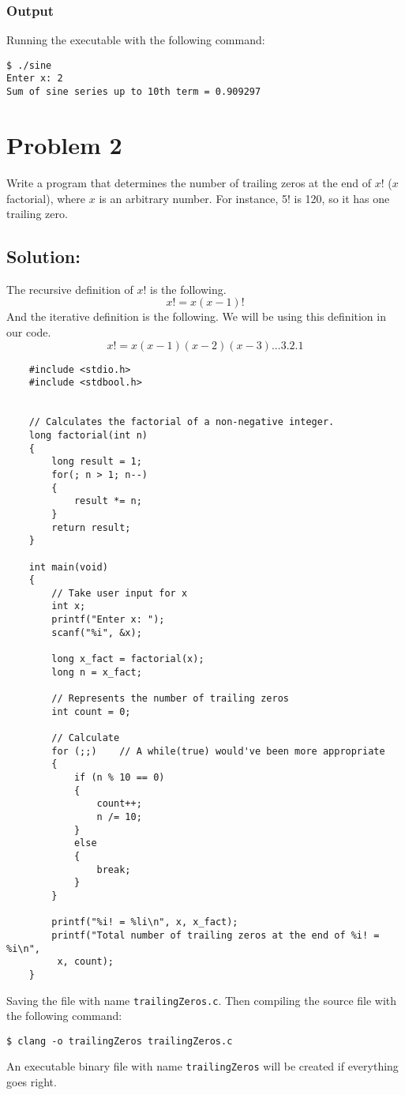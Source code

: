 \documentclass[12pt, letterpaper]{report}
\begin{document}
\subsubsection*{Output}
Running the executable with the following command:
\begin{verbatim}
$ ./sine
Enter x: 2
Sum of sine series up to 10th term = 0.909297
\end{verbatim}

\section*{Problem 2}
{\large Write a program that determines the number of trailing zeros at the end of $x!$ ($x$ factorial),
where $x$ is an arbitrary number. For instance, 5! is 120, so it has one trailing zero.}

\subsection*{Solution:}
The recursive definition of $x!$ is the following.
\begin{displaymath}
x! = x (x - 1)!
\end{displaymath}
And the iterative definition is the following. We will be using this definition in our code.
\begin{displaymath}
x! = x(x - 1)(x - 2)(x - 3)...3.2.1
\end{displaymath}

\begin{verbatim}
    #include <stdio.h>
    #include <stdbool.h>


    // Calculates the factorial of a non-negative integer.
    long factorial(int n)
    {
        long result = 1;
        for(; n > 1; n--)
        {
            result *= n;
        }
        return result;
    }

    int main(void)
    {
        // Take user input for x
        int x;
        printf("Enter x: ");
        scanf("%i", &x);

        long x_fact = factorial(x);
        long n = x_fact;

        // Represents the number of trailing zeros
        int count = 0;

        // Calculate
        for (;;)    // A while(true) would've been more appropriate
        {
            if (n % 10 == 0)
            {
                count++;
                n /= 10;
            }
            else
            {
                break;
            }
        }

        printf("%i! = %li\n", x, x_fact);
        printf("Total number of trailing zeros at the end of %i! = %i\n",
         x, count);
    }

\end{verbatim}
Saving the file with name \texttt{trailingZeros.c}. Then compiling the source file with the following command:
\begin{verbatim}
$ clang -o trailingZeros trailingZeros.c
\end{verbatim}
An executable binary file with name \texttt{trailingZeros} will be created if everything goes right.
\end{document}

